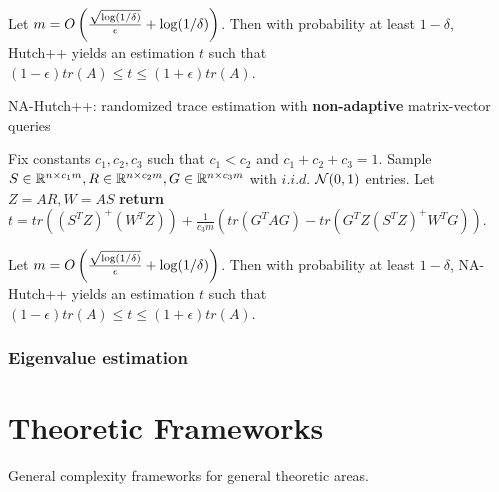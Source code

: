 \documentclass[10pt]{book}
\begin{document}
\begin{thm}
\label{tr_est_ada_alg}
Let $m=O\left(\frac{\sqrt{\log(1/\delta)}}{\epsilon}+\log(1/\delta)\right)$. Then with probability at least $1-\delta$, Hutch++ yields an estimation $t$ such that $(1-\epsilon)tr(A)\le t \le (1+\epsilon)tr(A)$.
\end{thm}

\bigskip
\begin{breakablealgorithm}
\caption{NA-Hutch++: randomized trace estimation with \textbf{non-adaptive} matrix-vector queries}
\label{na_hutch}
\begin{algorithmic}[1]
\State Fix constants $c_1,c_2,c_3$ such that $c_1<c_2$ and $c_1+c_2+c_3=1$.
\State Sample $S\in\mathbb{R}^{n\times c_1m},R\in\mathbb{R}^{n\times c_2m},G\in\mathbb{R}^{n\times c_3m}$ with $i.i.d.$ $\mathcal{N}(0,1)$ entries.
\State Let $Z=AR,W=AS$
\State \textbf{return} $t=tr((S^TZ)^+(W^TZ))+\frac{1}{c_3m}(tr(G^TAG)-tr(G^TZ(S^TZ)^+W^TG))$.
\end{algorithmic}
\end{breakablealgorithm}
\bigskip

\begin{thm}
\label{tr_est_nada_alg}
Let $m=O\left(\frac{\sqrt{\log(1/\delta)}}{\epsilon}+\log(1/\delta)\right)$. Then with probability at least $1-\delta$, NA-Hutch++ yields an estimation $t$ such that $(1-\epsilon)tr(A)\le t \le (1+\epsilon)tr(A)$.
\end{thm}
\pfsk{\ref{tr_est_nada_alg}}{

}

\subsection{Eigenvalue estimation}
\cite{braverman2021gradient}


\chapter{Theoretic Frameworks}
General complexity frameworks for general theoretic areas.


\end{document}
